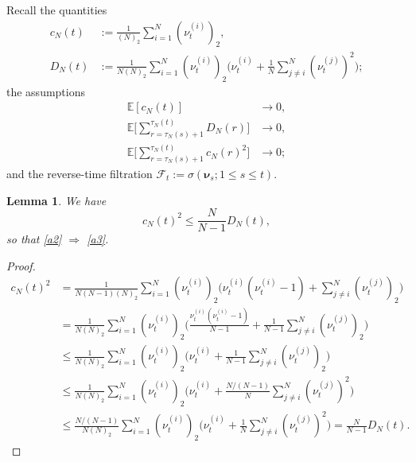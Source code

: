\documentclass[a4paper,11pt]{article}
\newtheorem{lem}{Lemma}
\theoremstyle{definition}
\newcommand{\F}{\mathcal{F}}
\newcommand{\E}{\mathbb{E}}
\newcommand{\1}{\mathds{1}}
\begin{document}
Recall the quantities
\begin{align*}
c_N( t ) &:= \frac{ 1 }{ ( N )_2 } \sum_{ i = 1 }^N ( \nu_t^{ ( i ) } )_2, \\
D_N( t ) &:= \frac{ 1 }{ N ( N )_2 } \sum_{ i = 1 }^N ( \nu_t^{ ( i ) } )_2 \Bigg( \nu_t^{ ( i )  } + \frac{ 1 }{ N } \sum_{ j \neq i }^N ( \nu_t^{ ( j ) } )^2 \Bigg);
\end{align*}
the assumptions
\begin{align}
\E[ c_N( t ) ] &\rightarrow 0, \label{a1} \\
\E\Bigg[ \sum_{ r = \tau_N( s ) + 1 }^{ \tau_N( t ) } D_N( r ) \Bigg] &\rightarrow 0, \label{a2} \\
\E\Bigg[ \sum_{ r = \tau_N( s ) + 1 }^{ \tau_N( t ) } c_N( r )^2 \Bigg] &\rightarrow 0; \label{a3}
\end{align}
and the reverse-time filtration $\F_t := \sigma( \bm{ \nu }_s; 1 \leq s \leq t )$.
\vskip 11pt
\begin{lem}
We have
\begin{equation*}
c_N( t )^2 \leq \frac{ N }{ N - 1 } D_N( t ),
\end{equation*}
so that \eqref{a2} $\Rightarrow$ \eqref{a3}.
\end{lem}
\begin{proof}
\begin{align*}
c_N( t )^2 &= \frac{ 1 }{ N ( N - 1 ) ( N )_2 } \sum_{ i = 1 }^N ( \nu_t^{ ( i ) } )_2 \Bigg( \nu_t^{ ( i ) } ( \nu_t^{ ( i ) } - 1 ) + \sum_{ j \neq i }^N ( \nu_t^{ ( j ) } )_2 \Bigg) \\
&= \frac{ 1 }{ N ( N )_2 } \sum_{ i = 1 }^N ( \nu_t^{ ( i ) } )_2 \Bigg( \frac{ \nu_t^{ ( i ) } ( \nu_t^{ ( i ) } - 1 ) }{ N - 1 } + \frac{ 1 }{ N - 1 } \sum_{ j \neq i }^N ( \nu_t^{ ( j ) } )_2 \Bigg) \\
&\leq \frac{ 1 }{ N ( N )_2 } \sum_{ i = 1 }^N ( \nu_t^{ ( i ) } )_2 \Bigg( \nu_t^{ ( i ) } + \frac{ 1 }{ N - 1 } \sum_{ j \neq i }^N ( \nu_t^{ ( j ) } )_2 \Bigg) \\
&\leq \frac{ 1 }{ N ( N )_2 } \sum_{ i = 1 }^N ( \nu_t^{ ( i ) } )_2 \Bigg( \nu_t^{ ( i ) } + \frac{ N / ( N - 1 ) }{ N } \sum_{ j \neq i }^N ( \nu_t^{ ( j ) } )^2 \Bigg) \\
&\leq \frac{ N / ( N - 1 ) }{ N ( N )_2 } \sum_{ i = 1 }^N ( \nu_t^{ ( i ) } )_2 \Bigg( \nu_t^{ ( i ) } + \frac{ 1 }{ N } \sum_{ j \neq i }^N ( \nu_t^{ ( j ) } )^2 \Bigg) = \frac{ N }{ N - 1 } D_N( t ).
\end{align*}
\end{proof}
\end{document}
